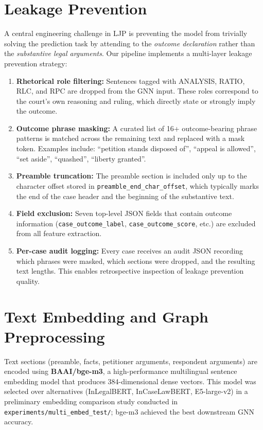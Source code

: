 \documentclass[12pt,a4paper]{report}
\begin{document}
\section{Leakage Prevention}
\label{sec:leakage}

A central engineering challenge in LJP is preventing the model from trivially solving the prediction task by attending to the \textit{outcome declaration} rather than the \textit{substantive legal arguments}. Our pipeline implements a multi-layer leakage prevention strategy:

\begin{enumerate}
  \item \textbf{Rhetorical role filtering:} Sentences tagged with ANALYSIS, RATIO, RLC, and RPC are dropped from the GNN input. These roles correspond to the court's own reasoning and ruling, which directly state or strongly imply the outcome.

  \item \textbf{Outcome phrase masking:} A curated list of 16+ outcome-bearing phrase patterns is matched across the remaining text and replaced with a mask token. Examples include: ``petition stands disposed of'', ``appeal is allowed'', ``set aside'', ``quashed'', ``liberty granted''.

  \item \textbf{Preamble truncation:} The preamble section is included only up to the character offset stored in \texttt{preamble\_end\_char\_offset}, which typically marks the end of the case header and the beginning of the substantive text.

  \item \textbf{Field exclusion:} Seven top-level JSON fields that contain outcome information (\texttt{case\_outcome\_label}, \texttt{case\_outcome\_score}, etc.) are excluded from all feature extraction.

  \item \textbf{Per-case audit logging:} Every case receives an audit JSON recording which phrases were masked, which sections were dropped, and the resulting text lengths. This enables retrospective inspection of leakage prevention quality.
\end{enumerate}

\section{Text Embedding and Graph Preprocessing}
\label{sec:embedding}

Text sections (preamble, facts, petitioner arguments, respondent arguments) are encoded using \textbf{BAAI/bge-m3}, a high-performance multilingual sentence embedding model that produces 384-dimensional dense vectors. This model was selected over alternatives (InLegalBERT, InCaseLawBERT, E5-large-v2) in a preliminary embedding comparison study conducted in \texttt{experiments/multi\_embed\_test/}; bge-m3 achieved the best downstream GNN accuracy.
\end{document}
